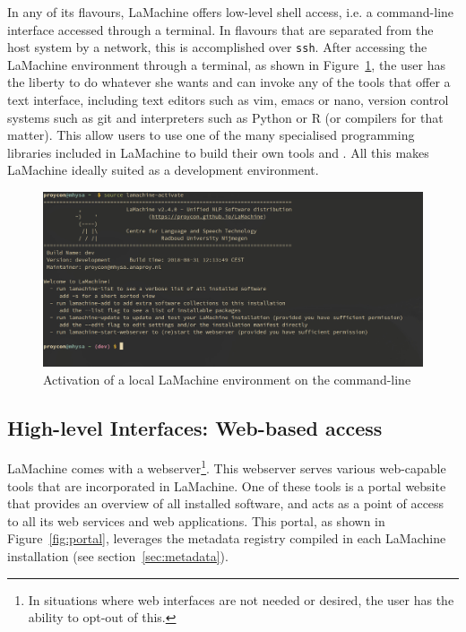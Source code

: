 \documentclass[a4paper,11pt]{article}
\begin{document}
In any of its flavours, LaMachine offers low-level shell access, i.e. a command-line interface accessed through a
terminal. In flavours that are separated from the host system by a network, this is accomplished over \texttt{ssh}.
After accessing the LaMachine environment through a terminal, as shown in Figure~\ref{fig:venv}, the user has the liberty to do whatever she wants and can invoke any
of the tools that offer a text interface, including text editors such as vim, emacs or nano, version control systems
such as git and interpreters such as Python or R (or compilers for that matter). This allow users to use
one of the many specialised programming libraries included in LaMachine to build their own tools and . All this makes
LaMachine ideally suited as a development environment.

\begin{figure}[htb] \begin{center}
\includegraphics[width=135.0mm]{screenshot_venv_activate.jpg}
\end{center}
\caption{\footnotesize{Activation of a local LaMachine environment on the command-line}}
\label{fig:venv}
\end{figure}

\subsection{High-level Interfaces: Web-based access}

LaMachine comes with a webserver\footnote{In situations where web interfaces are not needed or desired, the
user has the ability to opt-out of this.}. This webserver serves various web-capable tools that are incorporated in LaMachine. One
of these tools is a portal website that provides an overview of all installed software, and acts as a point of access to
all its web services and web applications. This portal, as shown in
Figure~\ref{fig:portal}, leverages the metadata registry compiled in each LaMachine installation (see
section~\ref{sec:metadata}).
\end{document}
